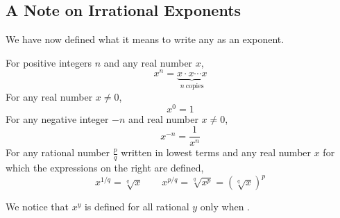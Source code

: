 \subsection{A Note on Irrational Exponents} 
We have now defined what it means to write any \makeblank as an exponent.
\begin{definition}
For positive integers $n$ and any real number $x$,
$$x^n=\underbrace{x\cdot x\cdots x}_{n\ \mathrm{copies}}$$
For any real number $x\neq 0$,
$$x^0=1$$
For any negative integer $-n$ and real number $x\neq 0$,
$$x^{-n}=\dfrac{1}{x^n}$$
For any rational number $\frac{p}{q}$ written in lowest terms and any real number $x$ for which the expressions on the right are defined,
$$x^{1/q}=\sqrt[q]{x}
\qquad
x^{p/q}=\sqrt[q]{x^p}=\left(\sqrt[q]{x}\right)^p$$
\end{definition}
We notice that $x^y$ is defined for all rational $y$ only when \makeblank[1in]. 